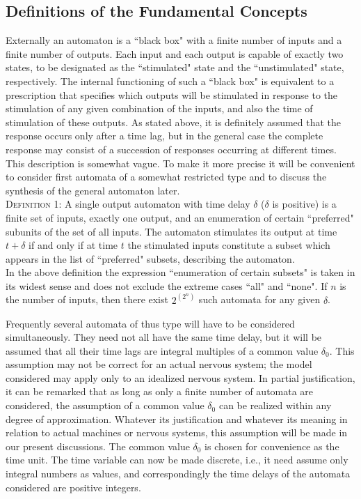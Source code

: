 \documentclass[twocolumn,preprintnumbers,amsmath,amssymb,floatfix]{revtex4}
\begin{document}
\subsection{\label{sec:two2}Definitions of the Fundamental Concepts}

Externally an automaton is a ``black box" with a finite number of
inputs and a finite number of outputs. Each input and each output
is capable of exactly two states, to be designated as the
``stimulated" state and the ``unstimulated" state, respectively.
The internal functioning of such a ``black box" is equivalent to a
prescription that specifies which outputs will be stimulated in
response to the stimulation of any given combination of the
inputs, and also the time of stimulation of these outputs. As
stated above, it is definitely assumed that the response occurs
only after a time lag, but in the general case the complete
response may consist of a succession of responses occurring at
different times. This description is somewhat vague. To make it
more precise it will be convenient to consider first automata of a
somewhat restricted type and to discuss the synthesis of the
general automaton later.\\

\noindent \textsc{Definition 1:} A single output automaton with
time delay $\delta$ ($\delta$ is positive) is a finite set of
inputs, exactly one output, and an enumeration of certain
``preferred" subunits of the set of all inputs. The automaton
stimulates its output at time $t+\delta$ if and only if at time
$t$ the stimulated inputs constitute a subset which appears in the
list of ``preferred" subsets, describing the automaton.\\

In the above definition the expression ``enumeration of certain
subsets" is taken in its widest sense and does not exclude the
extreme cases ``all" and ``none". If $n$ is the number of inputs,
then there exist $2^{(2^n)}$ such automata for any given $\delta$.

Frequently several automata of thus type will have to be
considered simultaneously. They need not all have the same time
delay, but it will be assumed that all their time lags are
integral multiples of a common value $\delta_0$. This assumption
may not be correct for an actual nervous system; the model
considered may apply only to an idealized nervous system. In
partial justification, it can be remarked that as long as only a
finite number of automata are considered, the assumption of a
common value $\delta_0$ can be realized within any degree of
approximation. Whatever its justification and whatever its meaning
in relation to actual machines or nervous systems, this assumption
will be made in our present discussions. The common value
$\delta_0$ is chosen for convenience as the time unit. The time
variable can now be made discrete, i.e., it need assume only
integral numbers as values, and correspondingly the time delays of
the automata considered are positive integers.
\end{document}
